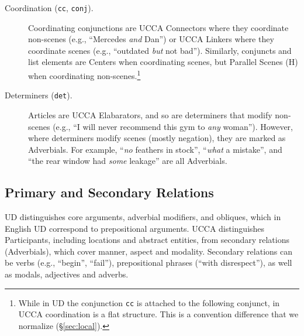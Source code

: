 \documentclass[11pt,a4paper]{article}
\begin{document}
\begin{description}
    

    \item[Coordination (\texttt{cc}, \texttt{conj}).]
      Coordinating conjunctions are UCCA Connectors where they coordinate non-scenes
      (e.g., ``Mercedes \textit{and} Dan'')
      or UCCA Linkers where they coordinate scenes (e.g., ``outdated \textit{but} not bad'').
      Similarly, conjuncts and list elements are Centers when coordinating scenes,
      but Parallel Scenes (H) when coordinating non-scenes.\footnote{While in UD 
      the conjunction \texttt{cc} is attached to the following conjunct,
      in UCCA coordination is a flat structure.
      This is a convention difference that we normalize (\S\ref{sec:local}).}

    \item [Determiners (\texttt{det}).]
      Articles are UCCA Elabarators, and so are determiners that modify non-scenes 
      (e.g., ``I will never recommend this gym to \textit{any} woman'').
      However, where determiners modify scenes (mostly negation),
      they are marked as Adverbials. For example, ``\textit{no} feathers in stock'', ``\textit{what} a mistake'',
      and ``the rear window had \textit{some} leakage'' are all Adverbials.

\end{description}



\subsection{Primary and Secondary Relations}\label{sec:arguments}

UD distinguishes core arguments, adverbial modifiers,
and obliques, which in English UD correspond to prepositional arguments.
UCCA distinguishes Participants, including locations and abstract entities,
from secondary relations (Adverbials), 
which cover manner, aspect and modality.
Secondary relations can be verbs (e.g., ``begin'', ``fail''),
prepositional phrases (``with disrespect''),
as well as modals, adjectives and adverbs.
\end{document}
